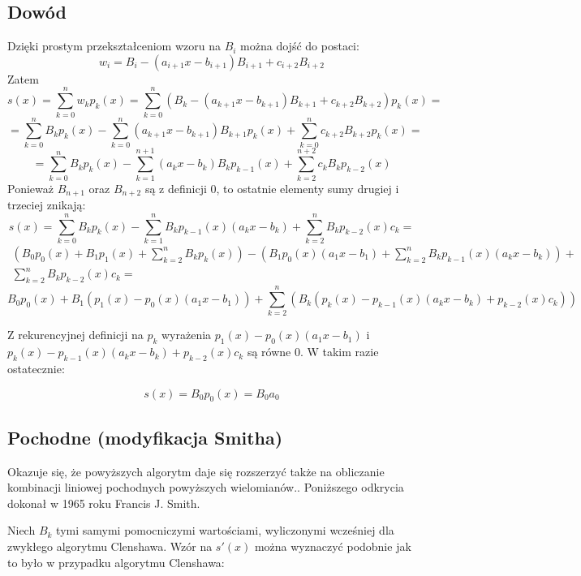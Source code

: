 \documentclass[11pt,leqno]{article}
\begin{document}
\subsection{Dowód}
Dzięki prostym przekształceniom wzoru na $B_i$ można dojść do postaci:
\[
w_i = B_i - (a_{i + 1} x - b_{i + 1}) B_{i + 1} + c_{i + 2} B_{i + 2}
\]
Zatem
\[
  s(x)
=
  \sum_{k = 0}^n
    w_k p_k(x)
=
  \sum_{k = 0}^n
    (B_k - (a_{k + 1} x - b_{k + 1}) B_{k + 1} + c_{k + 2} B_{k + 2}) p_k(x)
=
\]
\[
=
  \sum_{k = 0}^n
    B_k p_k(x)
  -
  \sum_{k = 0}^n
    (a_{k + 1} x - b_{k + 1}) B_{k+1} p_k(x)
  +
  \sum_{k = 0}^n
    c_{k + 2} B_{k + 2} p_k(x)
=
\]
\[
=
  \sum_{k = 0}^n
    B_k p_k(x)
  -
  \sum_{k = 1}^{n + 1}
    (a_k x - b_k) B_k p_{k - 1}(x)
  +
  \sum_{k = 2}^{n + 2}
    c_k B_k p_{k - 2}(x)
\]
Ponieważ $B_{n + 1}$ oraz $B_{n + 2}$ są z definicji 0, to ostatnie elementy sumy drugiej i trzeciej znikają:
\[
  s(x)
=
  \sum_{k = 0}^n
    B_k p_k(x)
  -
  \sum_{k = 1}^n
    B_k p_{k - 1}(x) (a_k x - b_k)
  +
  \sum_{k = 2}^n
    B_k p_{k - 2}(x) c_k
=
\]
\[
\begin{split}
  \left(
  B_0 p_0(x) + B_1 p_1(x) + \sum_{k = 2}^n
    B_k p_k(x)
  \right)
  -
  \left(
  B_1 p_0(x) (a_1 x - b_1) + \sum_{k = 2}^n
    B_k p_{k - 1}(x) (a_k x - b_k)
  \right)
  +\\
  \sum_{k = 2}^n
    B_k p_{k - 2}(x) c_k
=
\end{split}
\]
\[
  B_0 p_0(x) + B_1 (p_1(x) - p_0(x) (a_1 x - b_1)) + \sum_{k = 2}^n
    \left(
    B_k \left(p_k(x) - p_{k - 1}(x) (a_k x - b_k) + p_{k - 2}(x) c_k\right)
    \right)
\]

Z rekurencyjnej definicji na $p_k$ wyrażenia $p_1(x) - p_0(x) (a_1 x - b_1)$ i $p_k(x) - p_{k - 1}(x) (a_k x - b_k) + p_{k - 2}(x) c_k$ są równe 0. W takim razie ostatecznie:

\[
  s(x) = B_0 p_0(x) = B_0 a_0
\]



\subsection{Pochodne (modyfikacja Smitha)}
Okazuje się, że powyższych algorytm daje się rozszerzyć także na obliczanie kombinacji liniowej pochodnych powyższych wielomianów.. Poniższego odkrycia dokonał w 1965 roku Francis J. Smith.

Niech $B_k$ tymi samymi pomocniczymi wartościami, wyliczonymi wcześniej dla zwykłego algorytmu Clenshawa. Wzór na $s'(x)$ można wyznaczyć podobnie jak to było w przypadku algorytmu Clenshawa:
\end{document}
